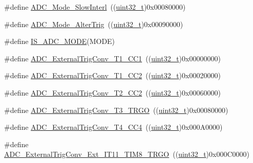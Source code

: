 \begin{DoxyCompactItemize}
\item 
\#define \hyperlink{group___a_d_c__mode_ga8b81e27e98dbc3d1e31452dbad167cd5}{A\+D\+C\+\_\+\+Mode\+\_\+\+Slow\+Interl}~((\hyperlink{_p_e___types_8h_a33594304e786b158f3fb30289278f5af}{uint32\+\_\+t})0x00080000)
\item 
\#define \hyperlink{group___a_d_c__mode_ga5595f12dc485e301ba3bad0e165586c1}{A\+D\+C\+\_\+\+Mode\+\_\+\+Alter\+Trig}~((\hyperlink{_p_e___types_8h_a33594304e786b158f3fb30289278f5af}{uint32\+\_\+t})0x00090000)
\item 
\#define \hyperlink{group___a_d_c__mode_ga4abf4c7de28a42d7b124c9e403a6e537}{I\+S\+\_\+\+A\+D\+C\+\_\+\+M\+O\+DE}(M\+O\+DE)
\item 
\#define \hyperlink{group___a_d_c__external__trigger__sources__for__regular__channels__conversion_ga303f24361ea930f8214e9e68b63b244e}{A\+D\+C\+\_\+\+External\+Trig\+Conv\+\_\+\+T1\+\_\+\+C\+C1}~((\hyperlink{_p_e___types_8h_a33594304e786b158f3fb30289278f5af}{uint32\+\_\+t})0x00000000)
\item 
\#define \hyperlink{group___a_d_c__external__trigger__sources__for__regular__channels__conversion_ga8bf9fd9ad4e4c12ef41520ded2c3c332}{A\+D\+C\+\_\+\+External\+Trig\+Conv\+\_\+\+T1\+\_\+\+C\+C2}~((\hyperlink{_p_e___types_8h_a33594304e786b158f3fb30289278f5af}{uint32\+\_\+t})0x00020000)
\item 
\#define \hyperlink{group___a_d_c__external__trigger__sources__for__regular__channels__conversion_gadfeb40c1735b0ee50f8a5aafdd840cc6}{A\+D\+C\+\_\+\+External\+Trig\+Conv\+\_\+\+T2\+\_\+\+C\+C2}~((\hyperlink{_p_e___types_8h_a33594304e786b158f3fb30289278f5af}{uint32\+\_\+t})0x00060000)
\item 
\#define \hyperlink{group___a_d_c__external__trigger__sources__for__regular__channels__conversion_ga1cf4549534a00fe2f5527ad783204098}{A\+D\+C\+\_\+\+External\+Trig\+Conv\+\_\+\+T3\+\_\+\+T\+R\+GO}~((\hyperlink{_p_e___types_8h_a33594304e786b158f3fb30289278f5af}{uint32\+\_\+t})0x00080000)
\item 
\#define \hyperlink{group___a_d_c__external__trigger__sources__for__regular__channels__conversion_ga8f6a764b7de878c2e09bbb0d1061d69c}{A\+D\+C\+\_\+\+External\+Trig\+Conv\+\_\+\+T4\+\_\+\+C\+C4}~((\hyperlink{_p_e___types_8h_a33594304e786b158f3fb30289278f5af}{uint32\+\_\+t})0x000\+A0000)
\item 
\#define \hyperlink{group___a_d_c__external__trigger__sources__for__regular__channels__conversion_ga640de59aeac8cc3d96b6db3497975d02}{A\+D\+C\+\_\+\+External\+Trig\+Conv\+\_\+\+Ext\+\_\+\+I\+T11\+\_\+\+T\+I\+M8\+\_\+\+T\+R\+GO}~((\hyperlink{_p_e___types_8h_a33594304e786b158f3fb30289278f5af}{uint32\+\_\+t})0x000\+C0000)

\end{DoxyCompactItemize}
